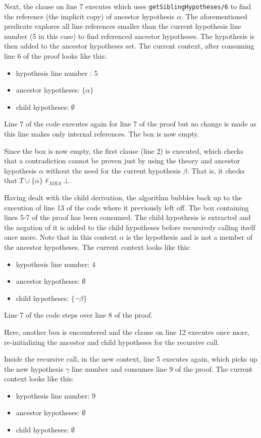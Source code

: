 \documentclass[11pt,twoside,a4paper]{report}
\begin{document}
Next, the clause on line 7 executes which uses \lstinline$getSiblingHypotheses/6$ to find the reference (the implicit copy) of ancestor hypothesis $\alpha$. The aforementioned predicate explores all line references smaller than the current hypothesis line number (5 in this case) to find referenced ancestor hypotheses. The hypothesis is then added to the ancestor hypotheses set. The current context, after consuming line 6 of the proof looks like this: 
\begin{itemize}
\item
hypothesis line number : 5
\item
ancestor hypotheses: $\{\alpha\}$
\item
child hypotheses: $\emptyset$
\end{itemize}

Line 7 of the code executes again for line 7 of the proof but no change is made as this line makes only internal references. The box is now empty.

Since the box is now empty, the first clause (line 2) is executed, which checks that a contradiction cannot be proven just by using the theory and ancestor hypothesis $\alpha$ without the need for the current hypothesis $\beta$. That is, it checks that $T\cup\{\alpha\}\nvdash_{MRA}\bot$.

Having dealt with the child derivation, the algorithm bubbles back up to the execution of line 13 of the code where it previously left off. The box containing lines 5-7 of the proof has been consumed. The child hypothesis is extracted and the negation of it is added to the child hypotheses before recursively calling itself once more. Note that in this context $\alpha$ is the hypothesis and is not a member of the ancestor hypotheses. The current context looks like this:
\begin{itemize}
\item
hypothesis line number: 4
\item
ancestor hypotheses: $\emptyset$
\item
child hypotheses: $\{\neg\beta\}$
\end{itemize}

Line 7 of the code steps over line 8 of the proof.

Here, another box is encountered and the clause on line 12 executes once more, re-initializing the ancestor and child hypotheses for the recursive call.

Inside the recursive call, in the new context, line 5 executes again, which picks up the new hypothesis $\gamma$ line number and consumes line 9 of the proof. The current context looks like this:
\begin{itemize}
\item
hypothesis line number: 9
\item
ancestor hypotheses: $\emptyset$
\item
child hypotheses: $\emptyset$
\end{itemize}
\end{document}
